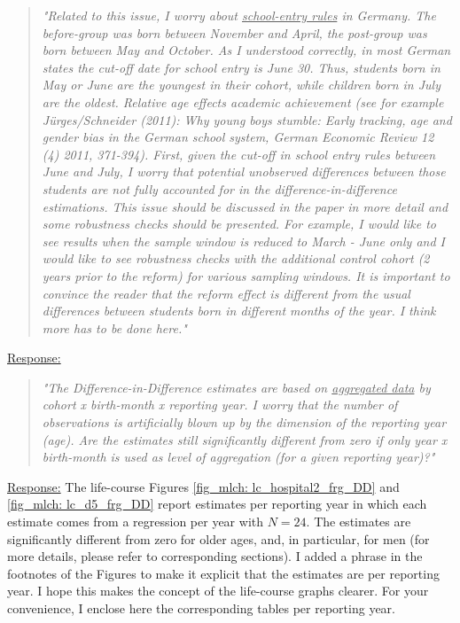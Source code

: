% 
\begin{quote}
	\textit{"Related to this issue, I worry about \underline{school-entry rules} in Germany. The before-group was born between November and April, the post-group was born between May and October. As I understood correctly, in most German states the cut-off date for school entry is June 30. Thus, students born in May or June are the youngest in their cohort, while children born in July are the oldest. Relative age effects academic achievement (see for example Jürges/Schneider (2011): Why young boys stumble: Early tracking, age and gender bias in the German school system, German Economic Review 12 (4) 2011, 371-394). First, given the cut-off in school entry rules between June and July, I worry that potential unobserved differences between those students are not fully accounted for in the difference-in-difference estimations. This issue should be discussed in the paper in more detail and some robustness checks should be presented. For example, I would like to see results when the sample window is reduced to March - June only and I would like to see robustness checks with the additional control cohort (2 years prior to the reform) for various sampling windows. It is important to convince the reader that the reform effect is different from the usual differences between students born in different months of the year. I think more has to be done here."}
\end{quote}
\underline{Response:}

% 
\begin{quote}
	\textit{"The Difference-in-Difference estimates are based on \underline{aggregated data} by cohort x birth-month x reporting year. I worry that the number of observations is artificially blown up by the dimension of the reporting year (age). Are the estimates still significantly different from zero if only year x birth-month is used as level of aggregation (for a given reporting year)?"}
\end{quote}
\underline{Response:} The life-course Figures \ref{fig_mlch: lc_hospital2_frg_DD} and \ref{fig_mlch: lc_d5_frg_DD} report estimates per reporting year in which each estimate comes from a regression per year with $N=24$. The estimates are significantly different from zero for older ages, and, in particular, for men (for more details, please refer to corresponding sections). I added a phrase in the footnotes of the Figures to make it explicit that the estimates are per reporting year. I hope this makes the concept of the life-course graphs clearer. For your convenience, I enclose here the corresponding tables per reporting year.

